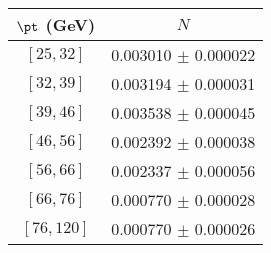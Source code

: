\begin{tabular}{c||c}
$\pt$ (GeV) & $N$  \\
\hline
$[25, 32]$ & 0.003010 $\pm$ 0.000022\\
$[32, 39]$ & 0.003194 $\pm$ 0.000031\\
$[39, 46]$ & 0.003538 $\pm$ 0.000045\\
$[46, 56]$ & 0.002392 $\pm$ 0.000038\\
$[56, 66]$ & 0.002337 $\pm$ 0.000056\\
$[66, 76]$ & 0.000770 $\pm$ 0.000028\\
$[76, 120]$ & 0.000770 $\pm$ 0.000026\\
\end{tabular}
